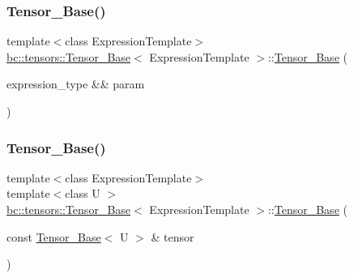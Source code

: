 \mbox{\label{classbc_1_1tensors_1_1Tensor__Base_aa410bdc31819c314f2beadc70512e914}} 
\subsubsection{\texorpdfstring{Tensor\+\_\+\+Base()}{Tensor\_Base()}\hspace{0.1cm}{\footnotesize\ttfamily [3/7]}}
{\footnotesize\ttfamily template$<$class Expression\+Template$>$ \\
\hyperlink{classbc_1_1tensors_1_1Tensor__Base}{bc\+::tensors\+::\+Tensor\+\_\+\+Base}$<$ Expression\+Template $>$\+::\hyperlink{classbc_1_1tensors_1_1Tensor__Base}{Tensor\+\_\+\+Base} (\begin{DoxyParamCaption}\item[{expression\+\_\+type \&\&}]{param }\end{DoxyParamCaption})\hspace{0.3cm}{\ttfamily [inline]}}

\mbox{\label{classbc_1_1tensors_1_1Tensor__Base_a58644f3efe86d99dea9b7f4a8645f3b6}} 
\subsubsection{\texorpdfstring{Tensor\+\_\+\+Base()}{Tensor\_Base()}\hspace{0.1cm}{\footnotesize\ttfamily [4/7]}}
{\footnotesize\ttfamily template$<$class Expression\+Template$>$ \\
template$<$class U $>$ \\
\hyperlink{classbc_1_1tensors_1_1Tensor__Base}{bc\+::tensors\+::\+Tensor\+\_\+\+Base}$<$ Expression\+Template $>$\+::\hyperlink{classbc_1_1tensors_1_1Tensor__Base}{Tensor\+\_\+\+Base} (\begin{DoxyParamCaption}\item[{const \hyperlink{classbc_1_1tensors_1_1Tensor__Base}{Tensor\+\_\+\+Base}$<$ U $>$ \&}]{tensor }\end{DoxyParamCaption})\hspace{0.3cm}{\ttfamily [inline]}}

